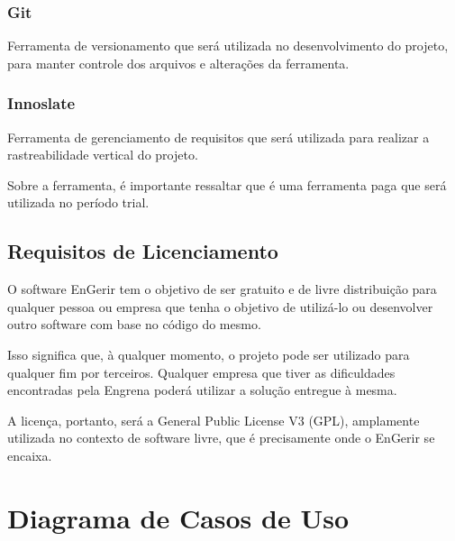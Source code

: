 \begin{apendicesenv}
\subsection{Git}

Ferramenta de versionamento que será utilizada no desenvolvimento do projeto, para manter controle dos arquivos e alterações da ferramenta.


\subsection{Innoslate}

Ferramenta de gerenciamento de requisitos que será utilizada para realizar a rastreabilidade vertical do projeto.

Sobre a ferramenta, é importante ressaltar que é uma ferramenta paga que será utilizada no período trial.

\section{Requisitos de Licenciamento}

O software EnGerir tem o objetivo de ser gratuito e de livre distribuição para qualquer pessoa ou empresa que tenha o objetivo de utilizá-lo ou desenvolver outro software com base no código do mesmo.

Isso significa que, à qualquer momento, o projeto pode ser utilizado para qualquer fim por terceiros. Qualquer empresa que tiver as dificuldades encontradas pela Engrena poderá utilizar a solução entregue à mesma.

A licença, portanto, será a General Public License V3 (GPL), amplamente utilizada no contexto de software livre, que é precisamente onde o EnGerir se encaixa.






























\chapter{Diagrama de Casos de Uso}
\label{use-diagram}



\end{apendicesenv}
